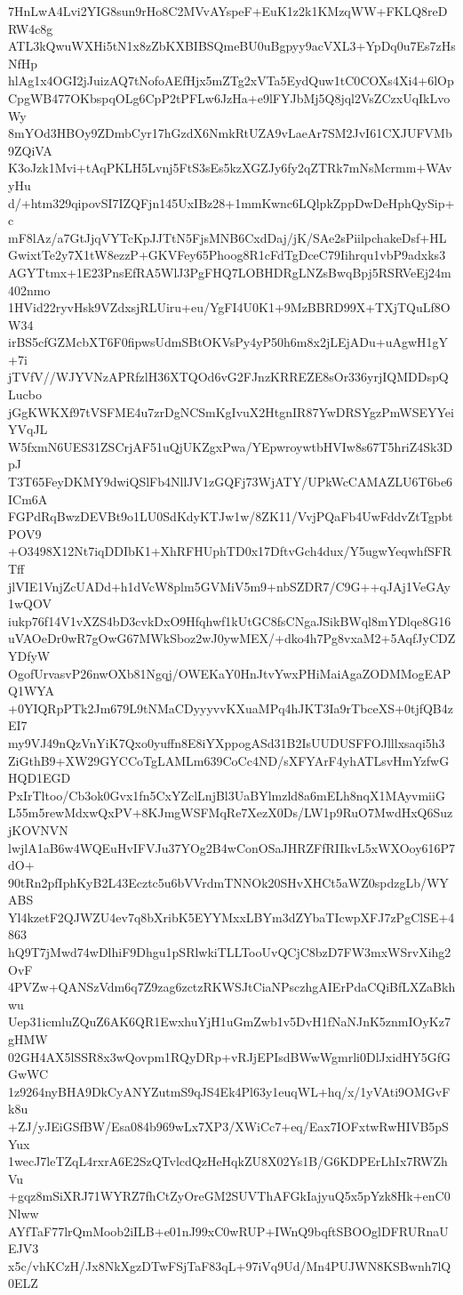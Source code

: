 7HnLwA4Lvi2YIG8sun9rHo8C2MVvAYspeF+EuK1z2k1KMzqWW+FKLQ8reDRW4c8g
ATL3kQwuWXHi5tN1x8zZbKXBIBSQmeBU0uBgpyy9acVXL3+YpDq0u7Es7zHsNfHp
hlAg1x4OGI2jJuizAQ7tNofoAEfHjx5mZTg2xVTa5EydQuw1tC0COXs4Xi4+6lOp
CpgWB477OKbspqOLg6CpP2tPFLw6JzHa+e9lFYJbMj5Q8jql2VsZCzxUqIkLvoWy
8mYOd3HBOy9ZDmbCyr17hGzdX6NmkRtUZA9vLaeAr7SM2JvI61CXJUFVMb9ZQiVA
K3oJzk1Mvi+tAqPKLH5Lvnj5FtS3sEs5kzXGZJy6fy2qZTRk7mNsMcrmm+WAvyHu
d/+htm329qipovSI7IZQFjn145UxIBz28+1mmKwnc6LQlpkZppDwDeHphQySip+c
mF8lAz/a7GtJjqVYTcKpJJTtN5FjsMNB6CxdDaj/jK/SAe2sPiilpchakeDsf+HL
GwixtTe2y7X1tW8ezzP+GKVFey65Phoog8R1cFdTgDceC79Iihrqu1vbP9adxks3
AGYTtmx+1E23PnsEfRA5WlJ3PgFHQ7LOBHDRgLNZsBwqBpj5RSRVeEj24m402nmo
1HVid22ryvHsk9VZdxsjRLUiru+eu/YgFI4U0K1+9MzBBRD99X+TXjTQuLf8OW34
irBS5cfGZMcbXT6F0fipwsUdmSBtOKVsPy4yP50h6m8x2jLEjADu+uAgwH1gY+7i
jTVfV//WJYVNzAPRfzlH36XTQOd6vG2FJnzKRREZE8sOr336yrjIQMDDspQLucbo
jGgKWKXf97tVSFME4u7zrDgNCSmKgIvuX2HtgnIR87YwDRSYgzPmWSEYYeiYVqJL
W5fxmN6UES31ZSCrjAF51uQjUKZgxPwa/YEpwroywtbHVIw8s67T5hriZ4Sk3DpJ
T3T65FeyDKMY9dwiQSlFb4NllJV1zGQFj73WjATY/UPkWcCAMAZLU6T6be6ICm6A
FGPdRqBwzDEVBt9o1LU0SdKdyKTJw1w/8ZK11/VvjPQaFb4UwFddvZtTgpbtPOV9
+O3498X12Nt7iqDDIbK1+XhRFHUphTD0x17DftvGch4dux/Y5ugwYeqwhfSFRTff
jlVIE1VnjZcUADd+h1dVcW8plm5GVMiV5m9+nbSZDR7/C9G++qJAj1VeGAy1wQOV
iukp76f14V1vXZS4bD3cvkDxO9Hfqhwf1kUtGC8fsCNgaJSikBWql8mYDlqe8G16
uVAOeDr0wR7gOwG67MWkSboz2wJ0ywMEX/+dko4h7Pg8vxaM2+5AqfJyCDZYDfyW
OgofUrvasvP26nwOXb81Ngqj/OWEKaY0HnJtvYwxPHiMaiAgaZODMMogEAPQ1WYA
+0YIQRpPTk2Jm679L9tNMaCDyyyvvKXuaMPq4hJKT3Ia9rTbceXS+0tjfQB4zEI7
my9VJ49nQzVnYiK7Qxo0yuffn8E8iYXppogASd31B2IsUUDUSFFOJlllxsaqi5h3
ZiGthB9+XW29GYCCoTgLAMLm639CoCc4ND/sXFYArF4yhATLsvHmYzfwGHQD1EGD
PxIrTltoo/Cb3ok0Gvx1fn5CxYZclLnjBl3UaBYlmzld8a6mELh8nqX1MAyvmiiG
L55m5rewMdxwQxPV+8KJmgWSFMqRe7XezX0Ds/LW1p9RuO7MwdHxQ6SuzjKOVNVN
lwjlA1aB6w4WQEuHvIFVJu37YOg2B4wConOSaJHRZFfRIIkvL5xWXOoy616P7dO+
90tRn2pfIphKyB2L43Ecztc5u6bVVrdmTNNOk20SHvXHCt5aWZ0spdzgLb/WYABS
Yl4kzetF2QJWZU4ev7q8bXribK5EYYMxxLBYm3dZYbaTIcwpXFJ7zPgClSE+4863
hQ9T7jMwd74wDlhiF9Dhgu1pSRlwkiTLLTooUvQCjC8bzD7FW3mxWSrvXihg2OvF
4PVZw+QANSzVdm6q7Z9zag6zctzRKWSJtCiaNPsczhgAIErPdaCQiBfLXZaBkhwu
Uep31icmluZQuZ6AK6QR1EwxhuYjH1uGmZwb1v5DvH1fNaNJnK5znmIOyKz7gHMW
02GH4AX5lSSR8x3wQovpm1RQyDRp+vRJjEPIsdBWwWgmrli0DlJxidHY5GfGGwWC
1z9264nyBHA9DkCyANYZutmS9qJS4Ek4Pl63y1euqWL+hq/x/1yVAti9OMGvFk8u
+ZJ/yJEiGSfBW/Esa084b969wLx7XP3/XWiCc7+eq/Eax7IOFxtwRwHIVB5pSYux
1wecJ7leTZqL4rxrA6E2SzQTvlcdQzHeHqkZU8X02Ys1B/G6KDPErLhIx7RWZhVu
+gqz8mSiXRJ71WYRZ7fhCtZyOreGM2SUVThAFGkIajyuQ5x5pYzk8Hk+enC0Nlww
AYfTaF77lrQmMoob2iILB+e01nJ99xC0wRUP+IWnQ9bqftSBOOglDFRURnaUEJV3
x5c/vhKCzH/Jx8NkXgzDTwFSjTaF83qL+97iVq9Ud/Mn4PUJWN8KSBwnh7lQ0ELZ
